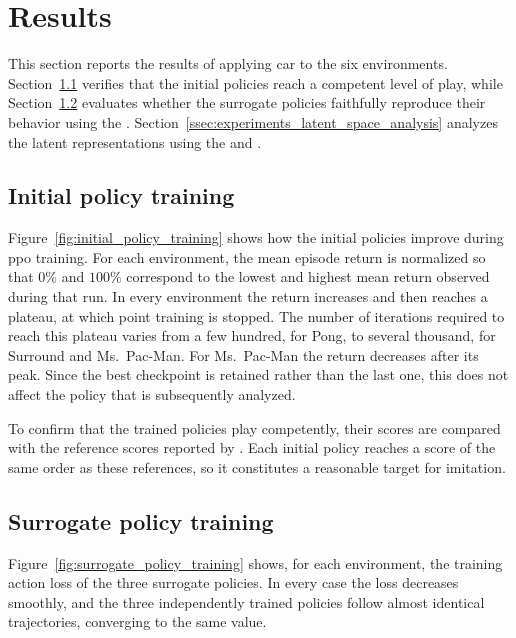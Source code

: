 \section{Results}
\label{sec:experiments_results}

This section reports the results of applying \gls{car} to the six environments.
Section~\ref{ssec:initial_policy_training} verifies that the initial policies reach a competent level of play, while Section~\ref{ssec:surrogate_policy_training} evaluates whether the surrogate policies faithfully reproduce their behavior using the \BehaviorReconstructionName.
Section~\ref{ssec:experiments_latent_space_analysis} analyzes the latent representations using the \AbstractionScoreName and \ClusteringUniversalityName.


\subsection{Initial policy training}
\label{ssec:initial_policy_training}



Figure~\ref{fig:initial_policy_training} shows how the initial policies improve during \gls{ppo} training.
For each environment, the mean episode return is normalized so that $0\%$ and $100\%$ correspond to the lowest and highest mean return observed during that run.
In every environment the return increases and then reaches a plateau, at which point training is stopped.
The number of iterations required to reach this plateau varies from a few hundred, for Pong, to several thousand, for Surround and Ms.\ Pac-Man.
For Ms.\ Pac-Man the return decreases after its peak.
Since the best checkpoint is retained rather than the last one, this does not affect the policy that is subsequently analyzed.

To confirm that the trained policies play competently, their scores are compared with the reference scores reported by \cite{machado2017revisitingarcadelearningenvironment}.
Each initial policy reaches a score of the same order as these references, so it constitutes a reasonable target for imitation.

\subsection{Surrogate policy training}
\label{ssec:surrogate_policy_training}

Figure~\ref{fig:surrogate_policy_training} shows, for each environment, the training action loss of the three surrogate policies.
In every case the loss decreases smoothly, and the three independently trained policies follow almost identical trajectories, converging to the same value.


